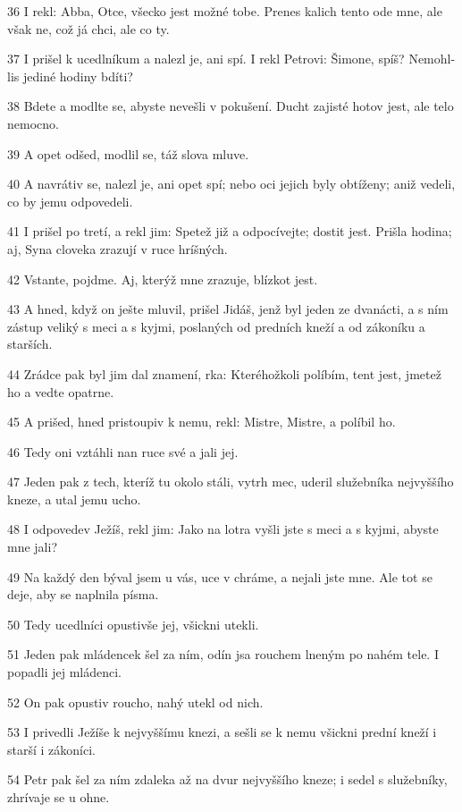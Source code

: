 \par 36 I rekl: Abba, Otce, všecko jest možné tobe. Prenes kalich tento ode mne, ale však ne, což já chci, ale co ty.
\par 37 I prišel k ucedlníkum a nalezl je, ani spí. I rekl Petrovi: Šimone, spíš? Nemohl-lis jediné hodiny bdíti?
\par 38 Bdete a modlte se, abyste nevešli v pokušení. Ducht zajisté hotov jest, ale telo nemocno.
\par 39 A opet odšed, modlil se, táž slova mluve.
\par 40 A navrátiv se, nalezl je, ani opet spí; nebo oci jejich byly obtíženy; aniž vedeli, co by jemu odpovedeli.
\par 41 I prišel po tretí, a rekl jim: Spetež již a odpocívejte; dostit jest. Prišla hodina; aj, Syna cloveka zrazují v ruce hríšných.
\par 42 Vstante, pojdme. Aj, kterýž mne zrazuje, blízkot jest.
\par 43 A hned, když on ješte mluvil, prišel Jidáš, jenž byl jeden ze dvanácti, a s ním zástup veliký s meci a s kyjmi, poslaných od predních kneží a od zákoníku a starších.
\par 44 Zrádce pak byl jim dal znamení, rka: Kteréhožkoli políbím, tent jest, jmetež ho a vedte opatrne.
\par 45 A prišed, hned pristoupiv k nemu, rekl: Mistre, Mistre, a políbil ho.
\par 46 Tedy oni vztáhli nan ruce své a jali jej.
\par 47 Jeden pak z tech, kteríž tu okolo stáli, vytrh mec, uderil služebníka nejvyššího kneze, a utal jemu ucho.
\par 48 I odpovedev Ježíš, rekl jim: Jako na lotra vyšli jste s meci a s kyjmi, abyste mne jali?
\par 49 Na každý den býval jsem u vás, uce v chráme, a nejali jste mne. Ale tot se deje, aby se naplnila písma.
\par 50 Tedy ucedlníci opustivše jej, všickni utekli.
\par 51 Jeden pak mládencek šel za ním, odín jsa rouchem lneným po nahém tele. I popadli jej mládenci.
\par 52 On pak opustiv roucho, nahý utekl od nich.
\par 53 I privedli Ježíše k nejvyššímu knezi, a sešli se k nemu všickni prední kneží i starší i zákoníci.
\par 54 Petr pak šel za ním zdaleka až na dvur nejvyššího kneze; i sedel s služebníky, zhrívaje se u ohne.

